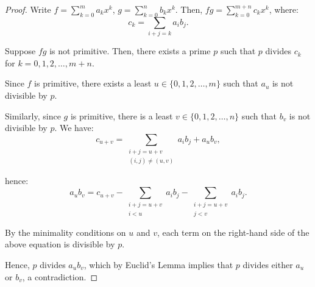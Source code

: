\documentclass[a4paper,12pt]{report}
\numberwithin{statement}{chapter}
\numberwithin{equation}{chapter}
\numberwithin{section}{chapter}
\numberwithin{subsection}{section}
\begin{document}
\begin{proof}

Write $f = \sum_{k = 0}^m a_k x^k$, $g = \sum_{k = 0}^n b_k x^k$.
Then, $fg = \sum_{k = 0}^{m+n}c_kx^k$, where:
\[
c_k = \sum_{i + j = k}a_ib_j.
\]

Suppose $fg$ is not primitive.  Then, there exists a prime $p$ such that $p$ divides $c_k$
for $k = 0, 1, 2,\ldots, m + n$.


Since $f$ is primitive, there exists a least
$u \in \{0, 1, 2, \ldots, m\}$ such that $a_u$ is not divisible by $p$.


Similarly, since $g$ is primitive, there is a least $v \in \{0, 1, 2, \ldots, n\}$
such that $b_v$ is not divisible by $p$.
We have:
\[
c_{u + v} = \sum_{\substack{i + j = u+v\\(i, j)\neq (u, v)}}a_ib_j + a_ub_v,
\]

hence:
\[
a_ub_v %
= c_{u + v} - \sum_{\substack{i + j = u + v\\i < u}}a_ib_j
- \sum_{\substack{i + j = u + v\\j < v}}a_ib_j.
\]

By the minimality conditions on $u$ and $v$, each term on the right-hand side of the above equation
is divisible by $p$.


Hence, $p$ divides $a_ub_v$, which by Euclid's Lemma implies that
$p$ divides either $a_u$ or $b_v$, a contradiction.


\end{proof}
\end{document}
